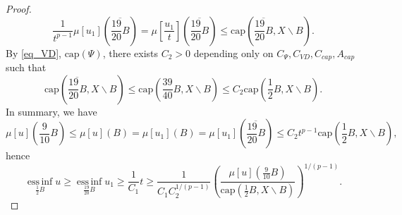 \documentclass[11pt,a4paper]{article}
\numberwithin{equation}{section}
\newcommand{\einf}{\operatorname*{ess\,inf}}
\theoremstyle{plain}
\theoremstyle{definition}
\begin{document}
\begin{proof}
$$\frac{1}{t^{p-1}}\mu[u_1]\left(\overline{\frac{19}{20}B}\right)=\mu\left[\frac{u_1}{t}\right]\left(\overline{\frac{19}{20}B}\right)\le \mathrm{cap}\left(\overline{\frac{19}{20}B},X\backslash B\right).$$
By \ref{eq_VD}, \hyperlink{eq_cap}{$\text{cap}(\Psi)$}, there exists $C_2>0$ depending only on $C_\Psi, C_{VD}, C_{cap}, A_{cap}$ such that
$$\mathrm{cap}\left(\overline{\frac{19}{20}B},X\backslash B\right)\le \mathrm{cap}\left({\frac{39}{40}B},X\backslash B\right)\le C_2 \mathrm{cap}\left(\frac{1}{2}B,X\backslash B\right).$$
In summary, we have
$$\mu[u]\left(\frac{9}{10}B\right)\le\mu[u](B)=\mu[u_1](B)=\mu[u_1]\left(\overline{\frac{19}{20}B}\right)\le C_2t^{p-1}\mathrm{cap}\left(\frac{1}{2}B,X\backslash B\right),$$
hence
$$\einf_{\frac{1}{2}B}u\ge\einf_{{\frac{19}{20}B}}u_1\ge \frac{1}{C_1}t\ge \frac{1}{C_1C_2^{1/(p-1)}}\left(\frac{\mu[u]\left(\frac{9}{10}B\right)}{\mathrm{cap}\left(\frac{1}{2}B,X\backslash B\right)}\right)^{1/(p-1)}.$$


\end{proof}
\end{document}
